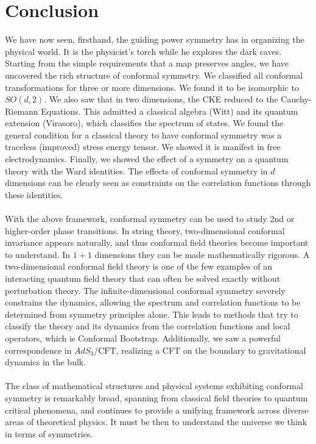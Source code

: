 \documentclass{article}
\begin{document}
\section{Conclusion}
We have now seen, firsthand, the guiding power symmetry has in organizing the physical world. It is the physicist's torch while he explores the dark caves. Starting from the simple requirements that a map preserves angles, we have uncovered the rich structure of conformal symmetry. We classified all conformal transformations for three or more dimensions. We found it to be isomorphic to $SO(d,2)$. We also saw that in two dimensions, the CKE reduced to the Cauchy-Riemann Equations. This admitted a classical algebra (Witt) and its quantum extension (Virasoro), which classifies the spectrum of states. We found the general condition for a classical theory to have conformal symmetry was a traceless (improved) stress energy tensor. We showed it is manifest in free electrodynamics. Finally, we showed the effect of a symmetry on a quantum theory with the Ward identities. The effects of conformal symmetry in $d$ dimensions can be clearly seen as constraints on the correlation functions through these identities. \\\\
With the above framework, conformal symmetry can be used to study 2nd or higher-order phase transitions. In string theory, two-dimensional conformal invariance appears naturally, and thus conformal field theories become important to understand. In $1+1$ dimensions they can be made mathematically rigorous. A two-dimensional conformal field theory is one of the few examples of an interacting quantum field theory that can often be solved exactly without perturbation theory. The infinite-dimensional conformal symmetry severely constrains the dynamics, allowing the spectrum and correlation functions to be determined from symmetry principles alone. This leads to methods that try to classify the theory and its dynamics from the correlation functions and local operators, which is Conformal Bootstrap. Additionally, we saw a powerful correspondence in $AdS_3/\text{CFT}$, realizing a CFT on the boundary to gravitational dynamics in the bulk. \\\\
The class of mathematical structures and physical systems exhibiting conformal symmetry is remarkably broad, spanning from classical field theories to quantum critical phenomena, and continues to provide a unifying framework across diverse areas of theoretical physics. It must be then to understand the universe we think in terms of symmetries. 

\newpage



\end{document}
